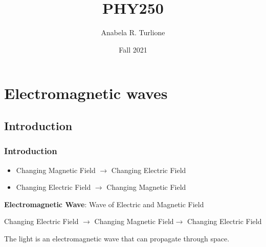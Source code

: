 \documentclass[]{beamer}
\title{PHY250}    %
\author{Anabela R. Turlione}                 %
\institute{Digipen}      %
\date{Fall 2021}                    %
\begin{document}
\begin{frame}
  \titlepage
\end{frame}

\section[]{}

\begin{frame}
  \tableofcontents
\end{frame}

\section{Electromagnetic waves}
\subsection{Introduction}

\begin{frame}
\frametitle{Introduction}


\begin{itemize}
 \item  Changing Magnetic Field $\rightarrow$ Changing Electric Field
\pause 

\item Changing Electric Field $\rightarrow$ Changing Magnetic Field
\end{itemize}

\vspace{3mm}


\textbf{Electromagnetic Wave}: Wave of Electric and Magnetic Field
\pause
\vspace{3mm}

Changing Electric Field $\rightarrow$ Changing Magnetic Field$\rightarrow$ Changing Electric Field 

\pause
\vspace{3mm}

The light is an electromagnetic wave that can propagate through space.

  \end{frame}
\end{document}

